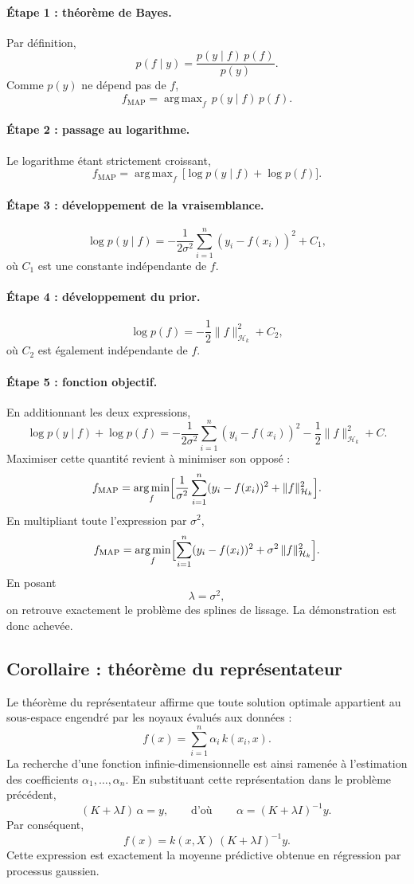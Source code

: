 \documentclass[12pt]{article}
\newcommand{\Hk}{\mathcal{H}_k}
\newcommand{\K}{K}
\DeclareMathOperator*{\argmin}{arg\,min}
\DeclareMathOperator*{\argmax}{arg\,max}
\begin{document}
\paragraph{Étape 1 : théorème de Bayes.}
Par définition,
\[
p(f \mid y) = \frac{p(y \mid f)\,p(f)}{p(y)}.
\]
Comme $p(y)$ ne dépend pas de $f$,
\[
f_{\text{MAP}} = \argmax_f\, p(y \mid f)\,p(f).
\]

\paragraph{Étape 2 : passage au logarithme.}
Le logarithme étant strictement croissant,
\[
f_{\text{MAP}} = \argmax_f\, \bigl[ \log p(y \mid f) + \log p(f) \bigr].
\]

\paragraph{Étape 3 : développement de la vraisemblance.}
\[
\log p(y \mid f) = -\frac{1}{2\sigma^2}\sum_{i=1}^n (y_i - f(x_i))^2 + C_1,
\]
où $C_1$ est une constante indépendante de $f$.

\paragraph{Étape 4 : développement du prior.}
\[
\log p(f) = -\frac12 \|f\|_{\Hk}^2 + C_2,
\]
où $C_2$ est également indépendante de $f$.

\paragraph{Étape 5 : fonction objectif.}
En additionnant les deux expressions,
\[
\log p(y \mid f) + \log p(f)
= -\frac{1}{2\sigma^2}\sum_{i=1}^n (y_i - f(x_i))^2 - \frac12 \|f\|_{\Hk}^2 + C.
\]
Maximiser cette quantité revient à minimiser son opposé :
\[
f_{\text{MAP}} = \argmin_f
\Bigl[ \frac{1}{\sigma^2}\sum_{i=1}^n (y_i - f(x_i))^2 + \|f\|_{\Hk}^2 \Bigr].
\]
En multipliant toute l'expression par $\sigma^2$,
\[
f_{\text{MAP}} = \argmin_f
\Bigl[ \sum_{i=1}^n (y_i - f(x_i))^2 + \sigma^2\,\|f\|_{\Hk}^2 \Bigr].
\]
En posant
\[
\lambda = \sigma^2,
\]
on retrouve exactement le problème des splines de lissage. La démonstration est
donc achevée.

\subsection*{Corollaire : théorème du représentateur}

Le théorème du représentateur affirme que toute solution optimale appartient au
sous-espace engendré par les noyaux évalués aux données :
\[
\boxed{\, f(x) = \sum_{i=1}^n \alpha_i\, k(x_i,x). \,}
\]
La recherche d'une fonction infinie-dimensionnelle est ainsi ramenée à
l'estimation des coefficients $\alpha_1,\dots,\alpha_n$. En substituant cette
représentation dans le problème précédent,
\[
(\K + \lambda I)\,\alpha = y,
\qquad\text{d'où}\qquad
\boxed{\, \alpha = (\K + \lambda I)^{-1} y. \,}
\]
Par conséquent,
\[
\boxed{\, f(x) = k(x,X)\,(\K + \lambda I)^{-1} y. \,}
\]
Cette expression est exactement la moyenne prédictive obtenue en régression par
processus gaussien.
\end{document}
